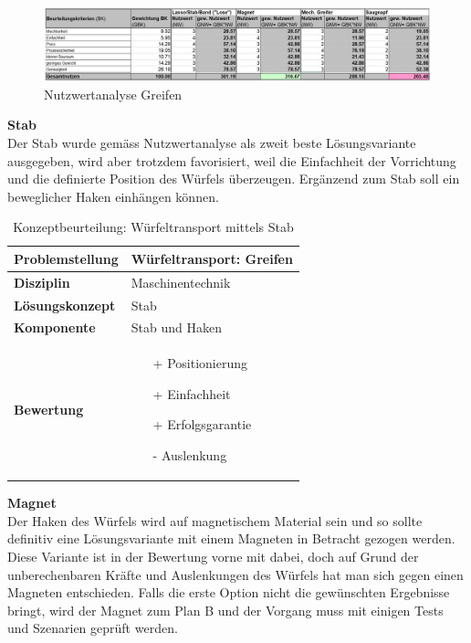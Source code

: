 \documentclass[../../main.tex]{subfiles}
\begin{document}
 \begin{figure}[H] %
    \centering
    \includegraphics[width=1\textwidth]{Greifen}
    \caption{Nutzwertanalyse Greifen}
    \label{fig:greifen}
\end{figure}

     \textbf{Stab}\\
 Der Stab wurde gemäss Nutzwertanalyse als zweit beste Lösungsvariante ausgegeben, wird aber trotzdem favorisiert, weil die Einfachheit der Vorrichtung und die definierte Position des Würfels überzeugen. Ergänzend zum Stab soll ein beweglicher Haken einhängen können.

\begin{flushleft}
    \begin{table}[h]
    \begin{tabular}{ | l | p{11cm} |}
    \hline
    \textbf{Problemstellung} & Würfeltransport: Greifen \\ \hline
    \textbf{Disziplin} & Maschinentechnik \\ \hline
    \textbf{Lösungskonzept} &  Stab \\ \hline
    \textbf{Komponente} & Stab und Haken \\ \hline
    \textbf{Bewertung} &  \begin{itemize}
                            \item[+] Positionierung
                            \item[+] Einfachheit
                            \item[+] Erfolgsgarantie 
                            \item[-] Auslenkung
                          \end{itemize} \\ \hline
    \end{tabular}
    \caption{Konzeptbeurteilung: Würfeltransport mittels Stab}
    \label{tab:konzept_wurfeltransport_stab}
\end{table}
\end{flushleft}

\textbf{Magnet}\\
 Der Haken des Würfels wird auf magnetischem Material sein und so sollte definitiv eine Lösungsvariante mit einem Magneten in Betracht gezogen werden. Diese Variante ist in der Bewertung vorne mit dabei, doch auf Grund der unberechenbaren Kräfte und Auslenkungen des Würfels hat man sich gegen einen Magneten entschieden. Falls die erste Option nicht die gewünschten Ergebnisse bringt, wird der Magnet zum Plan B und der Vorgang muss mit einigen Tests und Szenarien geprüft werden.
\end{document}

